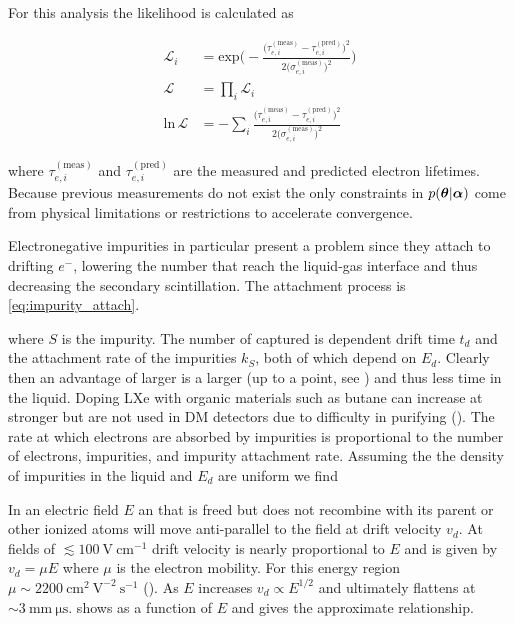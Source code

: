 For this analysis the likelihood is calculated as

\begin{equation}
\begin{aligned}
\mathcal{L}_i &= \mathrm{exp} \bigg( -\frac{\big(\tau_{e, i}^{(\mathrm{meas})} -
\tau_{e, i}^{(\mathrm{pred})} \big)^2}{2 \big(\sigma_{e, i}^{(\mathrm{meas})} \big)^2} \bigg) \\
\mathcal{L} &= \prod_i \mathcal{L}_i \\
\mathrm{ln}\, \mathcal{L} &= -\sum_i \frac{\big(\tau_{e, i}^{(\mathrm{meas})} -
\tau_{e, i}^{(\mathrm{pred})} \big)^2}{2\big(\sigma_{e, i}^{(\mathrm{meas})}\big)^2}
\end{aligned}
\end{equation}

\noindent where $\tau_{e, i}^{(\mathrm{meas})}$ and $\tau_{e, i}^{(\mathrm{pred})}$ are the measured and predicted electron
lifetimes.  Because previous measurements do not exist the only constraints in $p(\boldsymbol{\theta}|\boldsymbol{\alpha})$ come from physical
limitations or restrictions to accelerate convergence.

Electronegative impurities
in particular present a problem
since they attach to drifting $e^{-}$,
lowering the number that reach the liquid-gas interface and thus decreasing the secondary scintillation.  The attachment process
is \eqref{eq:impurity_attach}.

\noindent where $S$ is the impurity.  The number of \electron captured is dependent drift time $t_{d}$ and the
attachment rate of
the impurities $k_{S}$, both of which depend on $E_{d}$.  Clearly then an advantage of larger
\efields is a larger
\vd (up to a point, see ) and thus less time in the liquid.  Doping LXe with organic materials such as butane
can increase \vd at stronger
\efields but are not used in DM detectors due to difficulty in purifying ().  The rate at which electrons are
absorbed by impurities is proportional to the number of electrons, impurities, and impurity attachment rate.  Assuming the the density
of impurities in the liquid and $E_{d}$ are uniform we find

In an electric field $E$ an \electron that is freed but does not recombine with its parent or other ionized atoms will move anti-parallel
to the field at drift velocity $v_{d}$.  At fields of $\lesssim 100\ \mathrm{V\ cm^{-1}}$ drift velocity is nearly proportional to
$E$ and is given by $v_{d} = \mu E$
where $\mu$ is the electron mobility.  For this energy region $\mu \sim 2200\ \mathrm{cm^{2}\ V^{-2}\ s^{-1}}$ ().  As
$E$ increases $v_{d} \propto E^{1/2}$ and ultimately flattens at $\sim 3\ \mathrm{mm\ \mu s}$.   shows \vd
as a function of $E$ and  gives the approximate relationship.


